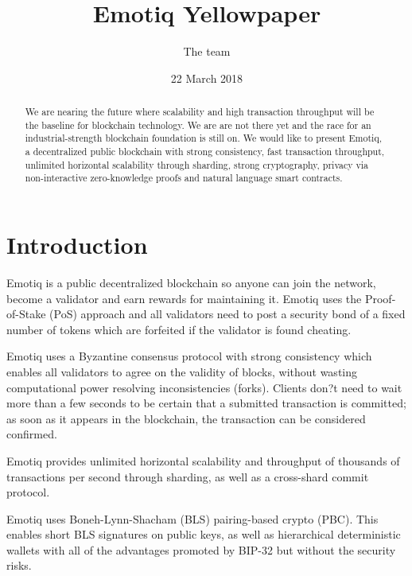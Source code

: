 \documentclass{yellowpaper}
\begin{document}
\title{Emotiq Yellowpaper}


\author{
\alignauthor
The team\\
}
\date{22 March 2018}

\maketitle

\begin{abstract}
We are nearing the future where scalability and high transaction throughput will be the baseline for blockchain technology. We are are not there yet and the race for an industrial-strength blockchain foundation is still on. We would like to present Emotiq, a decentralized public blockchain with strong consistency, fast transaction throughput, unlimited horizontal scalability through sharding, strong cryptography, privacy via non-interactive zero-knowledge proofs and natural language smart contracts.
\end{abstract}

\section{Introduction}

Emotiq is a public decentralized blockchain so anyone can join the network, become a validator and earn rewards for maintaining it. Emotiq uses the Proof-of-Stake (PoS) approach and all validators need to post a security bond of a fixed number of tokens which are forfeited if the validator is found cheating.

Emotiq uses a Byzantine consensus protocol with strong consistency which enables all validators to agree on the validity of blocks, without wasting computational power resolving inconsistencies (forks). Clients don?t need to wait more than a few seconds to be certain that a submitted transaction is committed; as soon as it appears in the blockchain, the transaction can be considered confirmed. 

Emotiq provides unlimited horizontal scalability and throughput of thousands of transactions per second through sharding, as well as a cross-shard commit protocol.

Emotiq uses Boneh-Lynn-Shacham (BLS) pairing-based crypto (PBC). This enables short BLS signatures on public keys, as well as hierarchical deterministic wallets with all of the advantages promoted by BIP-32 but without the security risks. 
\end{document}
